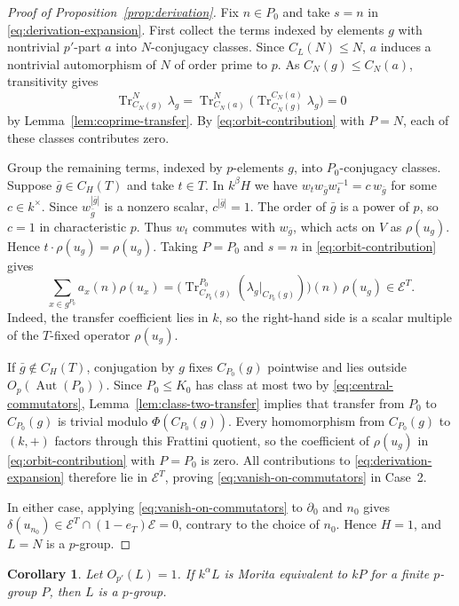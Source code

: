 \documentclass[11pt,a4paper]{article}
\newtheorem{corollary}[theorem]{Corollary}
\theoremstyle{definition}
\theoremstyle{remark}
\numberwithin{equation}{section}
\DeclareMathOperator{\Aut}{Aut}
\begin{document}
\begin{proof}[Proof of Proposition~\ref{prop:derivation}]
		Fix $n\in P_0$ and take $s=n$ in \eqref{eq:derivation-expansion}.
		First collect the terms indexed by elements $g$ with nontrivial $p'$-part $a$ into
		$N$-conjugacy classes. Since $C_L(N)\le N$, $a$ induces a nontrivial
		automorphism of $N$ of order prime to $p$. As $C_N(g)\le C_N(a)$,
		transitivity gives
		\[
		\operatorname{Tr}_{C_N(g)}^N\lambda_g
		=\operatorname{Tr}_{C_N(a)}^N
		\bigl(\operatorname{Tr}_{C_N(g)}^{C_N(a)}\lambda_g\bigr)=0
		\]
		by Lemma~\ref{lem:coprime-transfer}. By \eqref{eq:orbit-contribution}
		with $P=N$, each of these classes contributes zero.
		
		Group the remaining terms, indexed by $p$-elements $g$, into
		$P_0$-conjugacy classes. Suppose $\bar g\in C_H(T)$ and take $t\in T$.
		In $k^\beta H$ we have
		$w_tw_{\bar g}w_t^{-1}=c\,w_{\bar g}$ for some $c\in k^\times$.
		Since $w_{\bar g}^{|\bar g|}$ is a nonzero scalar,
		$c^{|\bar g|}=1$. The order of $\bar g$ is a power of $p$, so $c=1$
		in characteristic $p$. Thus $w_t$ commutes with $w_{\bar g}$, which
		acts on $V$ as $\rho(u_g)$. Hence $t\cdot\rho(u_g)=\rho(u_g)$.
		Taking $P=P_0$ and $s=n$ in \eqref{eq:orbit-contribution} gives
		\[
		\sum_{x\in g^{P_0}}a_x(n)\rho(u_x)
		=\bigl(\operatorname{Tr}_{C_{P_0}(g)}^{P_0}
		(\lambda_g|_{C_{P_0}(g)})\bigr)(n)\,\rho(u_g)
		\in\mathcal E^T.
		\]
		Indeed, the transfer coefficient lies in $k$, so the right-hand side
		is a scalar multiple of the $T$-fixed operator $\rho(u_g)$.
		
		If $\bar g\notin C_H(T)$, conjugation by $g$ fixes $C_{P_0}(g)$
		pointwise and lies outside $O_p(\Aut(P_0))$. Since $P_0\le K_0$
		has class at most two by \eqref{eq:central-commutators},
		Lemma~\ref{lem:class-two-transfer} implies that transfer
		from $P_0$ to $C_{P_0}(g)$ is trivial modulo $\Phi(C_{P_0}(g))$.
		Every homomorphism from $C_{P_0}(g)$ to $(k,+)$ factors through this
		Frattini quotient, so the coefficient of $\rho(u_g)$ in
		\eqref{eq:orbit-contribution} with $P=P_0$ is zero. All contributions
		to \eqref{eq:derivation-expansion} therefore lie in $\mathcal E^T$, proving
		\eqref{eq:vanish-on-commutators} in Case~2.
		
		In either case, applying \eqref{eq:vanish-on-commutators} to
		$\partial_0$ and $n_0$ gives
		$\delta(u_{n_0})\in\mathcal E^T\cap(1-e_T)\mathcal E=0$,
		contrary to the choice of $n_0$. Hence $H=1$, and $L=N$ is a $p$-group.
	\end{proof}
	
	\begin{corollary}\label{cor:twisted}
		Let $O_{p'}(L)=1$. If $k^\alpha L$ is Morita equivalent to $kP$ for
		a finite $p$-group $P$, then $L$ is a $p$-group.
	\end{corollary}
	
\end{document}
